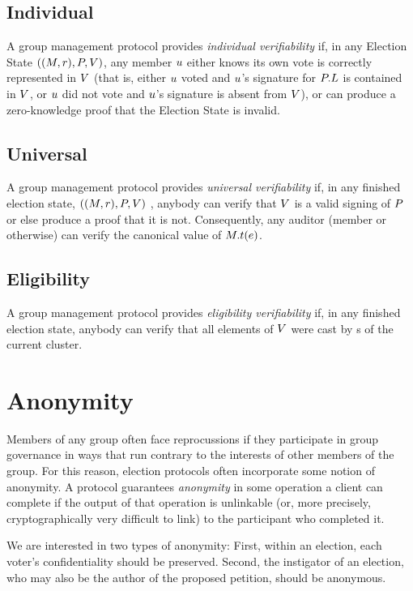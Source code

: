   \subsection{Individual}
  A group management protocol provides \emph{individual verifiability} if, in
  any Election State $((M, r), P, V)$, any member
  $u$ either knows its own vote is correctly represented in $V$
  (that is, either $u$ voted and $u$'s signature for
  $P.L$  is contained
  in $V$, or $u$ did not vote and $u$'s signature is
  absent from $V$), or can produce a zero-knowledge proof that the
  Election State is invalid.

  \subsection{Universal}
  A group management protocol provides \emph{universal verifiability} if, in any
  finished election state, $((M, r), P, V)$ , anybody can
  verify that $V$ is a valid signing of $P$ or else produce a
  proof that it is not. Consequently, any auditor (member or otherwise) can
  verify the canonical value of $M.t(e)$.

  \subsection{Eligibility}
  A group management protocol provides \emph{eligibility verifiability} if, in
  any finished election state, anybody can verify that all elements of
  $V$ were cast by \KwMember s of the current cluster.

\section{Anonymity}
Members of any group often face reprocussions if they participate in group
governance in ways that run contrary to the interests of other members of
the group. For this reason, election protocols often incorporate some notion
of anonymity. A protocol guarantees \emph{anonymity} in some operation a
client can complete if the output of that operation is unlinkable (or, more
precisely, cryptographically very difficult to link) to the participant who
completed it\cite{ford_hiding_2014}.

We are interested in two types of anonymity: First, within an election,
each voter's confidentiality should be preserved. Second, the instigator of an
election, who may also be the author of the proposed petition, should be
anonymous.

